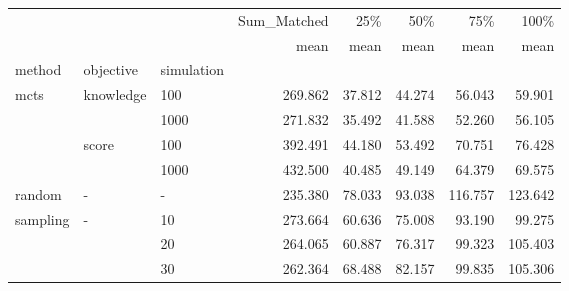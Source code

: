\begin{tabular}{lllrrrrr}
\toprule
         &   &    & Sum\_Matched &    25\% &    50\% &     75\% &    100\% \\
         &   &    &        mean &   mean &   mean &    mean &    mean \\
method & objective & simulation &             &        &        &         &         \\
\midrule
mcts & knowledge & 100 &     269.862 & 37.812 & 44.274 &  56.043 &  59.901 \\
         &   & 1000 &     271.832 & 35.492 & 41.588 &  52.260 &  56.105 \\
         & score & 100 &     392.491 & 44.180 & 53.492 &  70.751 &  76.428 \\
         &   & 1000 &     432.500 & 40.485 & 49.149 &  64.379 &  69.575 \\
random & - & - &     235.380 & 78.033 & 93.038 & 116.757 & 123.642 \\
sampling & - & 10 &     273.664 & 60.636 & 75.008 &  93.190 &  99.275 \\
         &   & 20 &     264.065 & 60.887 & 76.317 &  99.323 & 105.403 \\
         &   & 30 &     262.364 & 68.488 & 82.157 &  99.835 & 105.306 \\
\bottomrule
\end{tabular}
